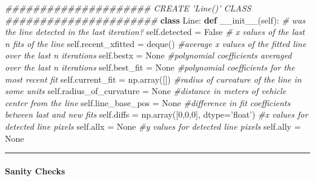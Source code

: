 \documentclass[11pt]{article}
\newenvironment{Shaded}{}{}
\newcommand{\KeywordTok}[1]{\textcolor[rgb]{0.00,0.44,0.13}{\textbf{{#1}}}}
\newcommand{\DecValTok}[1]{\textcolor[rgb]{0.25,0.63,0.44}{{#1}}}
\newcommand{\StringTok}[1]{\textcolor[rgb]{0.25,0.44,0.63}{{#1}}}
\newcommand{\CommentTok}[1]{\textcolor[rgb]{0.38,0.63,0.69}{\textit{{#1}}}}
\newcommand{\FunctionTok}[1]{\textcolor[rgb]{0.02,0.16,0.49}{{#1}}}
\newcommand{\NormalTok}[1]{{#1}}
\newcommand{\VariableTok}[1]{\textcolor[rgb]{0.10,0.09,0.49}{{#1}}}
\newcommand{\OperatorTok}[1]{\textcolor[rgb]{0.40,0.40,0.40}{{#1}}}
\begin{document}
\begin{Shaded}
\begin{Highlighting}[]
\CommentTok{##################### CREATE 'Line()' CLASS ######################}
\KeywordTok{class}\NormalTok{ Line:}
    \KeywordTok{def} \FunctionTok{__init__}\NormalTok{(}\VariableTok{self}\NormalTok{):}
        \CommentTok{# was the line detected in the last iteration?}
        \VariableTok{self}\NormalTok{.detected }\OperatorTok{=} \VariableTok{False}  
        \CommentTok{# x values of the last n fits of the line}
        \VariableTok{self}\NormalTok{.recent_xfitted }\OperatorTok{=}\NormalTok{ deque() }
        \CommentTok{#average x values of the fitted line over the last n iterations}
        \VariableTok{self}\NormalTok{.bestx }\OperatorTok{=} \VariableTok{None}    
        \CommentTok{#polynomial coefficients averaged over the last n iterations}
        \VariableTok{self}\NormalTok{.best_fit }\OperatorTok{=} \VariableTok{None}  
        \CommentTok{#polynomial coefficients for the most recent fit}
        \VariableTok{self}\NormalTok{.current_fit }\OperatorTok{=}\NormalTok{ np.array([])  }
        \CommentTok{#radius of curvature of the line in some units}
        \VariableTok{self}\NormalTok{.radius_of_curvature }\OperatorTok{=} \VariableTok{None} 
        \CommentTok{#distance in meters of vehicle center from the line}
        \VariableTok{self}\NormalTok{.line_base_pos }\OperatorTok{=} \VariableTok{None} 
        \CommentTok{#difference in fit coefficients between last and new fits}
        \VariableTok{self}\NormalTok{.diffs }\OperatorTok{=}\NormalTok{ np.array([}\DecValTok{0}\NormalTok{,}\DecValTok{0}\NormalTok{,}\DecValTok{0}\NormalTok{], dtype}\OperatorTok{=}\StringTok{'float'}\NormalTok{) }
        \CommentTok{#x values for detected line pixels}
        \VariableTok{self}\NormalTok{.allx }\OperatorTok{=} \VariableTok{None}
        \CommentTok{#y values for detected line pixels}
        \VariableTok{self}\NormalTok{.ally }\OperatorTok{=} \VariableTok{None}  
\end{Highlighting}
\end{Shaded}

\begin{center}\rule{0.5\linewidth}{\linethickness}\end{center}

\hypertarget{sanity-checks}{%
\paragraph{Sanity Checks}\label{sanity-checks}}
\end{document}
